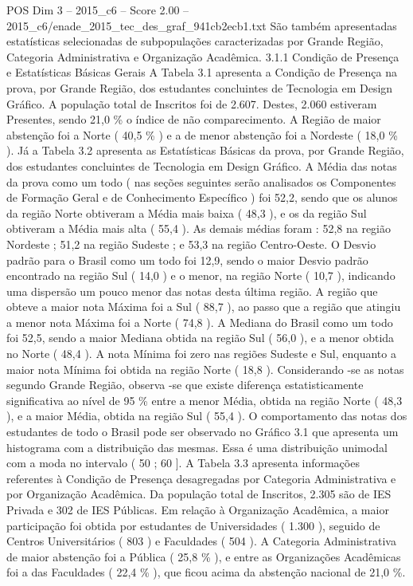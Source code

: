 \begin{textsample}{POS Dim 3 – 2015\_c6 – Score 2.00 – 2015\_c6/enade\_2015\_tec\_des\_graf\_941cb2ecb1.txt}
São também apresentadas estatísticas selecionadas de subpopulações caracterizadas por Grande Região, Categoria Administrativa e Organização Acadêmica. 3.1.1 Condição de Presença e Estatísticas Básicas Gerais A Tabela 3.1 apresenta a Condição de Presença na prova, por Grande Região, dos estudantes concluintes de Tecnologia em Design Gráfico.
A população total de Inscritos foi de 2.607.
Destes, 2.060 estiveram Presentes, sendo 21,0 \% o índice de não comparecimento.
A Região de maior abstenção foi a Norte ( 40,5 \% ) e a de menor abstenção foi a Nordeste ( 18,0 \% ).
Já a Tabela 3.2 apresenta as Estatísticas Básicas da prova, por Grande Região, dos estudantes concluintes de Tecnologia em Design Gráfico.
A Média das notas da prova como um todo ( nas seções seguintes serão analisados os Componentes de Formação Geral e de Conhecimento Específico ) foi 52,2, sendo que os alunos da região Norte obtiveram a Média mais baixa ( 48,3 ), e os da região Sul obtiveram a Média mais alta ( 55,4 ).
As demais médias foram : 52,8 na região Nordeste ; 51,2 na região Sudeste ; e 53,3 na região Centro-Oeste.
O Desvio padrão para o Brasil como um todo foi 12,9, sendo o maior Desvio padrão encontrado na região Sul ( 14,0 ) e o menor, na região Norte ( 10,7 ), indicando uma dispersão um pouco menor das notas desta última região.
A região que obteve a maior nota Máxima foi a Sul ( 88,7 ), ao passo que a região que atingiu a menor nota Máxima foi a Norte ( 74,8 ).
A Mediana do Brasil como um todo foi 52,5, sendo a maior Mediana obtida na região Sul ( 56,0 ), e a menor obtida no Norte ( 48,4 ).
A nota Mínima foi zero nas regiões Sudeste e Sul, enquanto a maior nota Mínima foi obtida na região Norte ( 18,8 ).
Considerando -se as notas segundo Grande Região, observa -se que existe diferença estatisticamente significativa ao nível de 95 \% entre a menor Média, obtida na região Norte ( 48,3 ), e a maior Média, obtida na região Sul ( 55,4 ).
O comportamento das notas dos estudantes de todo o Brasil pode ser observado no Gráfico 3.1 que apresenta um histograma com a distribuição das mesmas.
Essa é uma distribuição unimodal com a moda no intervalo ( 50 ; 60 ].
A Tabela 3.3 apresenta informações referentes à Condição de Presença desagregadas por Categoria Administrativa e por Organização Acadêmica.
Da população total de Inscritos, 2.305 são de IES Privada e 302 de IES Públicas.
Em relação à Organização Acadêmica, a maior participação foi obtida por estudantes de Universidades ( 1.300 ), seguido de Centros Universitários ( 803 ) e Faculdades ( 504 ).
A Categoria Administrativa de maior abstenção foi a Pública ( 25,8 \% ), e entre as Organizações Acadêmicas foi a das Faculdades ( 22,4 \% ), que ficou acima da abstenção nacional de 21,0 \%.

\end{textsample}
